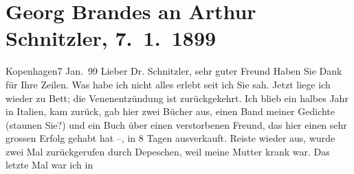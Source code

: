 

         
         \renewcommand{\erwaehntePersonen}{Personen: Richard Beer-Hofmann, Emilie Brandes, Joris-Karl Huysmans}
         \renewcommand{\erwaehnteOrte}{Orte: Deutschland, Dänemark, Frankreich, Italien, Kopenhagen, Lviv, Polen, Preußen, Südschleswig, Wien}
         \renewcommand{\erwaehnteWerke}{Werke: Das Vermächtnis. Schauspiel in drei Akten, Ein Dilemma, Julius Lange, Polen, Ungdomsvers [Jugendgedichte]}
               \section[Georg Brandes an Arthur Schnitzler, 7. 1. 1899]{ Georg Brandes an Arthur Schnitzler, 7. 1. 1899}\nopagebreak{}\rehead{ }\begin{ledgroupsized}[t]{13cm}\normalsize\beginnumbering \toendnotes[C]{\smallbreak\pagebreak[2]} 
\toendnotes[C]{\smallbreak}\pstart
           \raggedleft{}{\pb}Kopenhagen7 Jan. 99\pend
           \pstart{}Lieber Dr. Schnitzler, sehr guter Freund\pend\pstart
           Haben Sie Dank für Ihre Zeilen. Was habe ich nicht alles erlebt seit ich Sie sah.
               Jetzt liege ich wieder zu Bett; die Venenentzündung ist zurückgekehrt.\pend
           \pstart
           Ich blieb ein halbes Jahr in Italien, kam
               zurück, gab hier zwei Bücher aus, einen Band meiner Gedichte (staunen Sie?) und ein Buch über einen verstorbenen Freund, das
               hier einen sehr grossen Erfolg gehabt hat –, in 8 Tagen ausverkauft. Reiste wieder
               aus, wurde zwei Mal zurückgerufen durch Depeschen, {\pb}weil meine Mutter krank war. Das letzte Mal war ich in

\end{ledgroupsized}
